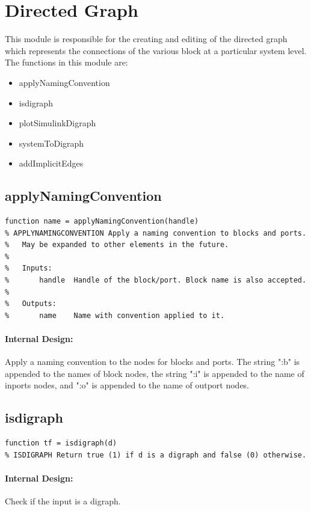 \documentclass[12pt,letterpaper]{report}
\begin{document}
\section{Directed Graph}
\par This module is responsible for the creating and editing of the directed graph which represents the connections of the various block at a particular system level. The functions in this module are:
\begin{itemize}
	\item applyNamingConvention
	\item isdigraph
	\item plotSimulinkDigraph
	\item systemToDigraph
	\item addImplicitEdges
\end{itemize}

\subsection{applyNamingConvention}
\begin{lstlisting}
function name = applyNamingConvention(handle)
% APPLYNAMINGCONVENTION Apply a naming convention to blocks and ports.
%   May be expanded to other elements in the future.
%
%   Inputs:
%       handle  Handle of the block/port. Block name is also accepted.
%
%   Outputs:
%       name    Name with convention applied to it.
\end{lstlisting}
\paragraph{Internal Design:} Apply a naming convention to the nodes for blocks and ports. The string ":b" is appended to the names of block nodes, the string ":i" is appended to the name of inports nodes, and ":o" is appended to the name of outport nodes.

\subsection{isdigraph}
\begin{lstlisting}
function tf = isdigraph(d)
% ISDIGRAPH Return true (1) if d is a digraph and false (0) otherwise.
\end{lstlisting}
\paragraph{Internal Design:} Check if the input is a digraph.
\end{document}
